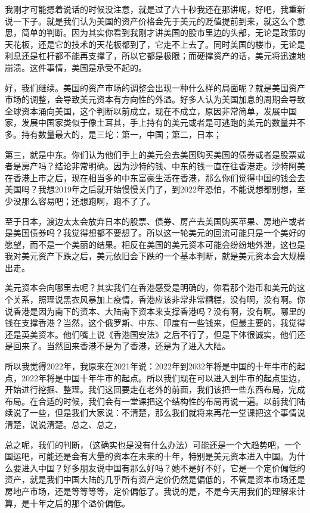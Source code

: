 \documentclass[UTF8, 12pt, a4paper]{ctexrep}
\begin{document}
我刚才可能摁着说话的时候没注意，就是过了六十秒我还在那讲呢，好吧，我重新说一下子。就是我们认为美国的资产价格会先于美元的贬值提前到来，就这么个意思，简单的判断。因为其实你看到我刚才讲美国的股市里边的头部，无论是政策的天花板，还是它的技术的天花板都到了，它走不上去了。同时美国的楼市，无论是利息还是杠杆都不能再支撑了，所以它都是极限；而硬撑资产的话，美元将迅速地崩溃。这件事情，美国是承受不起的。

好，我们继续。美国的资产市场的调整会出现一种什么样的局面呢？就是美国资产市场的调整，会导致美元资本有方向性的外溢。好多人认为美国加息的周期会导致全球资本涌向美国，这个判断以前成立，现在不成立，原因非常简单，发展中国家，发展中国家类似于像土耳其，手上持有的美元或者是可逃跑的美元的数量并不多。持有数量最大的，是三坨：第一，中国；第二，日本；

第三，就是中东。你们认为他们手上的美元会去美国购买美国的债券或者是股票或者是房产吗？结论非常明确。因为沙特的钱、中东的钱一直在往香港走。沙特阿美在香港上市之后，现在相当多的中东富豪生活在香港，那么你们觉得中国的钱会去美国吗？我想2019年之后就开始慢慢关门了，到2022年恐怕，不能说想都别想，至少没那么容易吧；还想跑啊，跑不了了。

至于日本，渡边太太会放弃日本的股票、债券、房产去美国购买苹果、房地产或者是美国债券吗？我觉得想都不要想了。所以这一轮美元的回流可能只是一个美好的愿望，而不是一个美丽的结果。相反在美国的美元资本可能会纷纷地外泄，这也是我对美元资产下跌之后，美元依旧会下跌的一个基本判断，就是美元资本会大规模出走。

美元资本会向哪里去呢？其实我们在香港感受是明确的，你看那个港币和美元的这个关系，照理说黑衣风暴加上疫情，香港应该非常非常糟糕，没有啊，没有啊。你说香港是因为南下的资本、大陆南下资本来支撑香港吗？没有啊，没有啊。哪里的钱在支撑香港？当然，这个俄罗斯、中东、印度有一些钱来，但最主要的，我觉得还是英美资本。他们嘴上说《香港国安法》之后不行了，但是下体很诚实，他们还是回来了。当然回来香港不是为了香港，还是为了进入大陆。

所以我觉得2022年，我原来在2021年说：2022年到2032年将是中国的十年牛市的起点，2022年将是中国十年牛市的起点。所以我们现在可以进入到牛市的起点里边，开始进行挖掘、整理。我们这回要走在老外的前面，我们该把一些东西布局，完成布局。在合适的时候，我们会有一堂课把这个结构性的布局再说一遍。以前我们陆续说了一些，但是我们大家说：不清楚，那么我们就将来再花一堂课把这个事情说清楚，说说清楚。总之、总之，

总之呢，我们的判断，（这确实也是没有什么办法）可能还是一个大趋势吧，一个国运吧，可能还是会有大量的资本在未来的十年，特别是美元资本进入中国。为什么要进入中国？好多朋友说中国有那么好吗？她不是好不好，它是一个定价偏低的资产，就是我们中国大陆的几乎所有资产定价仍然是偏低的，不管是资本市场还是房地产市场，还是等等等等，定价偏低了。我说的是，不是今天用我们的理解来计算，是十年之后的那个溢价偏低。
\end{document}
